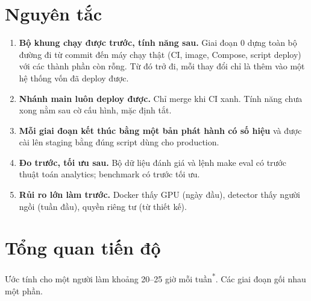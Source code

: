 \documentclass[10pt,a4paper,oneside,openany]{report}
\newcommand{\breakus}{\textunderscore\allowbreak}
\newcommand{\code}[1]{{\ttfamily\let\_\breakus #1}}
\newcommand{\uoc}{\textsuperscript{\textcolor{warn}{*}}}  %
\begin{document}
\section{Nguyên tắc}
\begin{enumerate}
  \item \textbf{Bộ khung chạy được trước, tính năng sau.} Giai đoạn 0 dựng toàn bộ đường đi từ commit đến máy chạy thật (CI, image,
        Compose, script deploy) với các thành phần còn rỗng. Từ đó trở đi, mỗi thay đổi chỉ là thêm vào một hệ thống vốn đã deploy được.
  \item \textbf{Nhánh \code{main} luôn deploy được.} Chỉ merge khi CI xanh. Tính năng chưa xong nằm sau cờ cấu hình, mặc định tắt.
  \item \textbf{Mỗi giai đoạn kết thúc bằng một bản phát hành có số hiệu} và được cài lên staging bằng đúng script dùng cho production.
  \item \textbf{Đo trước, tối ưu sau.} Bộ dữ liệu đánh giá và lệnh \code{make eval} có trước thuật toán analytics; benchmark có trước tối ưu.
  \item \textbf{Rủi ro lớn làm trước.} Docker thấy GPU (ngày đầu), detector thấy người ngồi (tuần đầu), quyền riêng tư (từ thiết kế).
\end{enumerate}

\section{Tổng quan tiến độ}
Ước tính cho một người làm khoảng 20--25 giờ mỗi tuần\uoc. Các giai đoạn gối nhau một phần.
\end{document}
